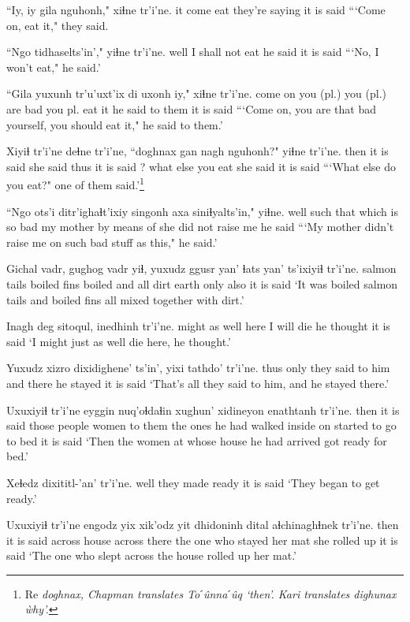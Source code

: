 \documentclass[12pt]{article}
\begin{document}
\gll ``Iy, iy gila nguhonh," xiɬne  tr'i'ne.
it {} come eat  {they're saying} {it is said}
\glt  ```Come on, eat it," they said.
\glend

\gll ``Ngo {tidhaselts'in',"} yiɬne tr'i'ne.
well {I shall not eat} {he said} {it is said}
\glt ```No, I won't eat," he said.'
\glend

\gll ``Gila yuxunh {tr'u'uxt'ix di} uxonh iy," xiɬne  tr'i'ne.
{come on} {you (pl.)} {you (pl.) are bad} {you pl. eat} it {he said to them} {it is said}
\glt ```Come on, you are that bad yourself, you should eat it," he said to them.'
\glend

\gll Xiyiɬ tr'i'ne deɬne tr'i'ne, ``doghnax gan nagh nguhonh?" yiɬne  tr'i'ne.
then {it is said} {she said thus} {it is said} ? what else {you eat} {she said} {it is said}
\glt ```What else do you eat?" one of them said.'\footnote{Re \em doghnax, \em Chapman translates \em Toˊ\^unnaˊ\^uq \em `then'. Kari translates \em dighunax \`why'.}
\glend

\gll ``Ngo ots'i ditr'ighaɬt'ixiy singonh axa {siniɬyalts'in,"} yiɬne.
well such {that which is so bad} {my mother} {by means of} {she did not raise me} {he said}
\glt ```My mother didn't raise me on such bad stuff as this," he said.'
\glend

\gll Gichal vadr, gughog vadr yiɬ, yuxudz {ggusr yan'} ɬats yan' ts'ixiyiɬ tr'i'ne.
{salmon tails} boiled fins boiled and all dirt earth only also  {it is said}
\glt `It was boiled salmon tails and boiled fins all mixed together with dirt.'
\glend

\gll Inagh deg sitoqul, inedhinh tr'i'ne.
{might as well} here {I will die} {he thought} {it is said}
\glt `I might just as well die here, he thought.'
\glend

\gll Yuxudz xizro dixidighene' ts'in', yixi tathdo' tr'i'ne.
thus  only {they said to him} and there {he stayed} {it is said}
\glt `That's all they said to him, and he stayed there.'
\glend

\gll Uxuxiyiɬ tr'i'ne eyggin nuq'oɬdaɬin xughun' xidineyon  enathtanh  tr'i'ne.
then  {it is said} {those people} women {to them} {the ones he had walked inside on} {started to go to bed} {it is said}
\glt `Then the women at whose house he had arrived got ready for bed.'
\glend

\gll Xeɬedz dixititl-'an'  tr'i'ne.
well {they made ready} {it is said}
\glt `They began to get ready.'
\glend

\gll Uxuxiyiɬ tr'i'ne engodz yix  xik'odz yit dhidoninh dital  aɬchinaghɬnek tr'i'ne.
then  {it is said} across  house  across  there {the one who stayed} {her mat} {she rolled up} {it is said}
\glt `The one who slept across the house rolled up her mat.'
\glend
\end{document}
